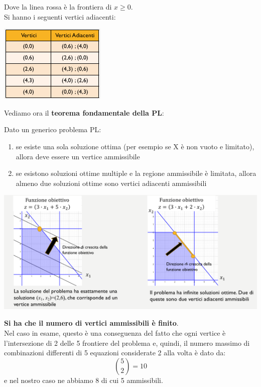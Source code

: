 \message{ !name(ro.tex)}\documentclass[a4paper,12pt, oneside]{book}
\begin{document}
Dove la linea rossa è la frontiera di $x\geq 0$.\\
Si hanno i seguenti vertici adiacenti:
\begin{center}
  \includegraphics[scale = 0.8]{img/simp5.png}
\end{center}
Vediamo ora il \textbf{teorema fondamentale della PL}:
\begin{teorema}
  Dato un generico problema PL:
  \begin{enumerate}
    \item se esiste una sola soluzione ottima (per esempio se X è non
    vuoto e limitato), allora deve essere un vertice ammissibile
    \item se esistono soluzioni ottime multiple e la regione
    ammissibile è limitata, allora almeno due soluzioni ottime sono
    vertici adiacenti ammissibili
  \end{enumerate}
  \begin{center}
    \includegraphics[scale = 0.8]{img/simp6.png}
  \end{center}
\end{teorema}
\textbf{Si ha che il numero di vertici ammissibili è finito}.\\
Nel caso in esame, questo è una conseguenza del fatto che
ogni vertice è l’intersezione di 2 delle 5 frontiere del
problema e, quindi, il numero massimo di combinazioni
differenti di 5 equazioni considerate 2 alla volta è dato da:
\[{5\choose{2}}=10\]
e nel nostro caso ne abbiamo 8 di cui 5 ammissibili.\\
\end{document}
